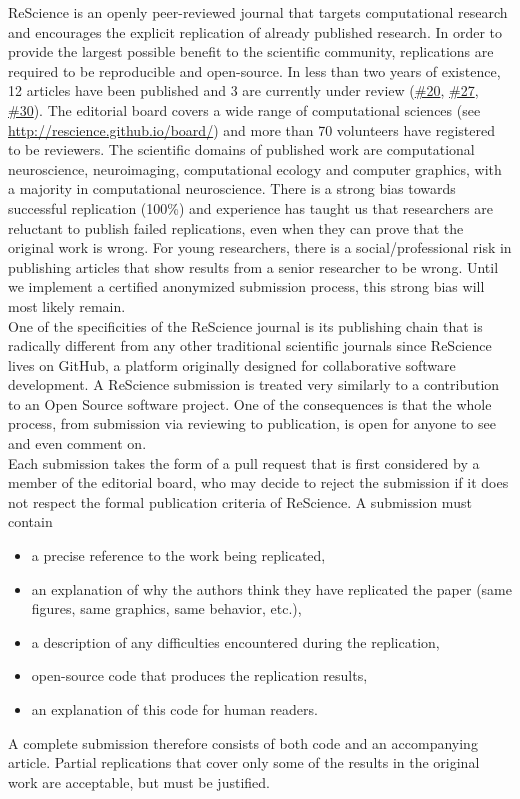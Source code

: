 \documentclass[a4paper,10pt, twocolumn]{article}
\begin{document}
ReScience is an openly peer-reviewed journal that targets computational research
and encourages the explicit replication of already published research. In order
to provide the largest possible benefit to the scientific community, replications are
required to be reproducible and open-source. In less than two years of existence, 12
articles have been published and 3 are currently under review
(\href{https://github.com/ReScience/ReScience-submission/pull/20}{\#20},
\href{https://github.com/ReScience/ReScience-submission/pull/27}{\#27},
\href{https://github.com/ReScience/ReScience-submission/pull/30}{\#30}). The
editorial board covers a wide range of computational sciences (see
\url{http://rescience.github.io/board/}) and more than 70 volunteers have registered to be reviewers. The scientific domains of published work
are computational neuroscience, neuroimaging, computational ecology and
computer graphics, with a majority in computational neuroscience. There is a
strong bias towards successful replication (100\%) and experience has
taught us that researchers are reluctant to publish failed replications, even when they can prove that the original work is wrong. For young researchers,
there is a social/professional risk in publishing articles that show
results from a senior researcher to be wrong. Until we implement a
certified anonymized submission process, this strong bias will most likely
remain.\\

One of the specificities of the ReScience journal is its publishing
chain that is radically different from any other traditional
scientific journals since ReScience lives on GitHub, a platform
originally designed for collaborative software development. A
ReScience submission is treated very similarly to a contribution to an
Open Source software project. One of the consequences is that the
whole process, from submission via reviewing
to publication, is open for anyone to see and even comment on.\\

Each submission takes the form of a pull request that is first
considered by a member of the editorial board, who may decide to
reject the submission if it does not respect the formal publication
criteria of ReScience. A submission must contain
\begin{itemize}
\item a precise reference to the work being replicated,
\item an explanation of why the authors think they have replicated the paper
      (same figures, same graphics, same behavior, etc.),
\item a description of any difficulties encountered during the
      replication,
\item open-source code that produces the replication results,
\item an explanation of this code for human readers.
\end{itemize}
A complete submission therefore consists of both code and an accompanying
article. Partial replications that cover only some of the results in the
original work are acceptable, but must be justified.\\
\end{document}
